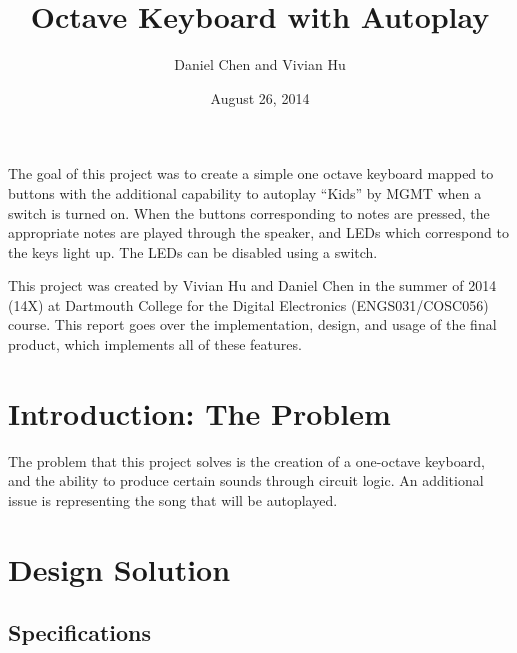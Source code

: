 \documentclass{article}
\title{Octave Keyboard with Autoplay}
\author{Daniel Chen and Vivian Hu}
\date{August 26, 2014}
\begin{document}
\maketitle

\vspace{-1.5em}

The goal of this project was to create a simple one­ octave keyboard mapped to buttons with the additional capability to autoplay ``Kids'' by MGMT when a switch is turned on. When the buttons corresponding to notes are pressed, the appropriate notes are played through the speaker, and LEDs which correspond to the keys light up. The LEDs can be disabled using a switch. 

This project was created by Vivian Hu and Daniel Chen in the summer of 2014 (14X) at Dartmouth College for the Digital Electronics (ENGS031/COSC056) course. This report goes over the implementation, design, and usage of the final product, which implements all of these features.

\vspace{-2.5em}
\newpage
\singlespacing

\newpage
\tableofcontents

\newpage
\section{Introduction: The Problem} %

  The problem that this project solves is the creation of a one-octave keyboard, and the ability to produce certain sounds through circuit logic. An additional issue is representing the song that will be autoplayed.

\vspace{-1em}
\section{Design Solution}

  \subsection{Specifications}
  
\end{document}

